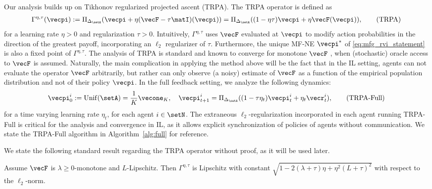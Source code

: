 Our analysis builds up on Tikhonov regularized projected ascent (TRPA).
The TRPA operator is defined as
\begin{align}
    \Gamma^{\eta, \tau}(\vecpi) := \Pi_{\Delta_\setA} ( \vecpi + \eta (\vecF - \tau \matI)(\vecpi) ) = \Pi_{\Delta_\setA} ( (1-\eta\tau) \vecpi + \eta \vecF(\vecpi) ), \tag{TRPA}
\end{align}
for a learning rate $\eta > 0$ and regularization $\tau > 0$.
Intuitively, $\Gamma^{\eta, \tau}$ uses $\vecF$ evaluated at $\vecpi$ to modify action probabilities in the direction of the greatest payoff, incorporating an $\ell_2$ regularizer of $\tau$.
Furthermore, the unique MF-NE $\vecpi^*$ of \eqref{eq:mfg_rvi_statement} is also a fixed point of $\Gamma^{\eta, \tau}$.
The analysis of TRPA is standard and known to converge for monotone $\vecF$ \citep{facchinei2003finite, nemirovski2004prox}, when (stochastic) oracle access to $\vecF$ is assumed.
Naturally, the main complication in applying the method above will be the fact that in the IL setting, agents can not evaluate the operator $\vecF$ arbitrarily, but rather can only observe (a noisy) estimate of $\vecF$ as a function of the empirical population distribution and not of their policy $\vecpi$.
In the full feedback setting, we analyze the following dynamics:
\begin{align}
     \vecpi_0^i := \operatorname{Unif} (\setA) = \frac{1}{K}\vecone_K, \hspace{1em} \vecpi^i_{t+1} =\Pi_{\Delta_\setA} ( (1 - \tau \eta_t) \vecpi_t^i + \eta_t \vecr_t^i ), \tag{TRPA-Full}
\end{align}
for a time varying learning rate $\eta_t$, for each agent $i \in \setN$.
The extraneous $\ell_2$-regularization incorporated in each agent running TRPA-Full is critical for the analysis and convergence in IL, as it allows explicit synchronization of policies of agents without communication.
We state the TRPA-Full algorithm in Algorithm~\ref{alg:full} for reference.

We state the following standard result regarding the TRPA operator without proof, as it will be used later.

\begin{lemma}\label{lemma:contraction_pg}
Assume $\vecF$ is $\lambda\geq 0$-monotone and $L$-Lipschitz.
Then $\Gamma^{\eta,\tau}$ is Lipschitz with constant $\sqrt{1 - 2 (\lambda + \tau) \eta + \eta^2 (L+\tau)^2}$ with respect to the $\ell_2$-norm.
\end{lemma}

